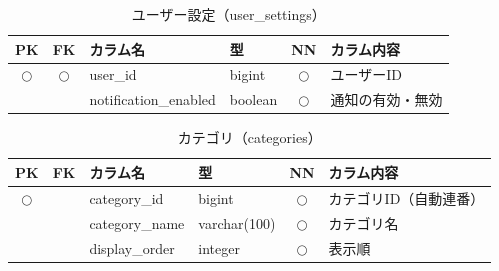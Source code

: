
\begin{table}[H]
    \centering
    \caption{ユーザー設定（user\_settings）}
    \label{tab:db_user_settings}
    \small
    \begin{tabularx}{\textwidth}{|c|c|l|l|c|X|}
        \hline
        PK & FK & カラム名 & 型 & NN & カラム内容 \\ \hline
        $\bigcirc$ & $\bigcirc$ & user\_id & bigint & $\bigcirc$ & ユーザーID \\ \hline
        & & notification\_enabled & boolean & $\bigcirc$ & 通知の有効・無効 \\ \hline
    \end{tabularx}
\end{table}



\begin{table}[H]
    \centering
    \caption{カテゴリ（categories）}
    \label{tab:db_categories}
    \small
    \begin{tabularx}{\textwidth}{|c|c|l|l|c|X|}
        \hline
        PK & FK & カラム名 & 型 & NN & カラム内容 \\ \hline
        $\bigcirc$ & & category\_id & bigint & $\bigcirc$ & カテゴリID（自動連番） \\ \hline
        & & category\_name & varchar(100) & $\bigcirc$ & カテゴリ名 \\ \hline
        & & display\_order & integer & $\bigcirc$ & 表示順 \\ \hline
    \end{tabularx}
\end{table}



